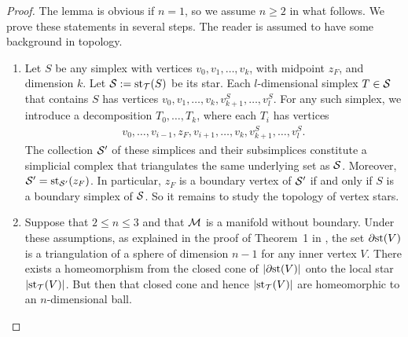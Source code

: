 \documentclass[10pt,letterpaper]{article}
\begin{document}
\begin{proof}
    The lemma is obvious if $n = 1$, so we assume $n \geq 2$ in what follows. 
    We prove these statements in several steps. 
    The reader is assumed to have some background in topology. 
    \begin{enumerate}
    \item 
    Let $S$ be any simplex with vertices $v_0, v_1, \dots, v_k$, with midpoint $z_F$, and dimension $k$.
    Let ${\mathcal S} := \operatorname{st}_{{\mathcal T}}(S)$ be its star. 
    Each $l$-dimensional simplex $T \in {\mathcal S}$ that contains $S$ 
    has vertices $v_0, v_1, \dots, v_k, v_{k+1}^{S}, \dots, v_{l}^{S}$. 
    For any such simplex, we introduce a decomposition $T_{0}, \dots, T_{k}$, where each $T_{i}$ has vertices 
    \begin{align*}
        v_0, \dots, v_{i-1}, z_F, v_{i+1}, \dots, v_k, v_{k+1}^{S}, \dots, v_{l}^{S}.
    \end{align*}
    The collection ${\mathcal S}'$ of these simplices and their subsimplices constitute a simplicial complex 
    that triangulates the same underlying set as ${\mathcal S}$.
    Moreover, ${\mathcal S}' = \operatorname{st}_{{\mathcal S}'}(z_F)$. 
    In particular, $z_F$ is a boundary vertex of ${\mathcal S}'$ if and only if $S$ is a boundary simplex of ${\mathcal S}$. 
    So it remains to study the topology of vertex stars. 
    
    \item 
    Suppose that $2 \leq n \leq 3$ and that ${\mathcal M}$ is a manifold without boundary. 
    Under these assumptions, 
    as explained in the proof of Theorem~1 in \cite{Siebenmann1979},
    the set ${\partial \rm st}(V)$ is a triangulation of a sphere of dimension $n-1$ for any inner vertex $V$. 
    There exists a homeomorphism from the closed cone of $\left| {\partial \rm st}(V) \right|$ onto the local star $\left| \operatorname{st}_{{\mathcal T}}(V) \right|$.
    But then that closed cone and hence $\left| \operatorname{st}_{{\mathcal T}}(V) \right|$ are homeomorphic to an $n$-dimensional ball. 
    

\end{enumerate}
\end{proof}
\end{document}

